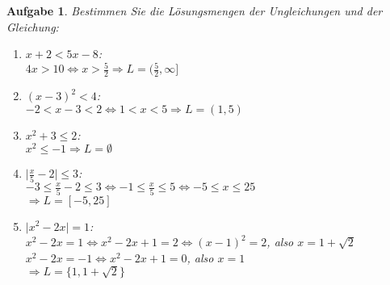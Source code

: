 \documentclass[12pt]{article}
\newtheorem{exercise}[satz]{Aufgabe}
\begin{document}
   \begin{exercise}
  Bestimmen Sie die L\"osungsmengen der Ungleichungen und der Gleichung:
  \begin{enumerate}
  \item[(a)] $x+2<5x-8$:\\ 
             $4x>10 \Leftrightarrow x>\frac{5}{2} \Rightarrow L = (\frac{5}{2},\infty]$
  \item[(b)] $(x-3)^2<4$:\\ 
             $ -2<x-3<2 \Leftrightarrow 1<x<5 \Rightarrow L = (1,5)$
  \item[(c)] $x^2+3\leq 2$:\\ 
             $ x^2 \leq -1 \Rightarrow L = \emptyset$
  \item[(d)] $\vert \frac{x}{5}-2 \vert \leq 3$:\\ 
             $-3 \leq \frac{x}{5}-2 \leq 3 \Leftrightarrow -1 \leq \frac{x}{5} \leq 5\Leftrightarrow -5 \leq x \leq 25$\\
             $\Rightarrow L =[-5,25]$
  \item[(e)] $\vert x^2-2x \vert = 1$:\\ 
            $ x^2-2x = 1 \Leftrightarrow x^2-2x+1 = 2 \Leftrightarrow (x-1)^2 = 2$, also $x = 1+\sqrt{2}$\\
            $ x^2-2x = -1 \Leftrightarrow x^2-2x+1 = 0 $, also $x = 1$\\
            $\Rightarrow L =\{1,1+\sqrt{2}\}$
  \end{enumerate}
   \end{exercise}
\end{document}
